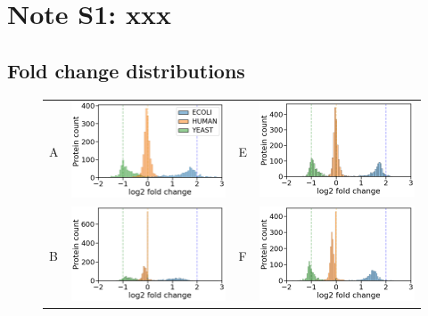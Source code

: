 \documentclass[11pt]{article}
\begin{document}
\maketitle

\section*{Note S1: xxx}
\label{sec:fc-eval}


\iffalse
\subsection*{Fold change distributions}
\begin{figure}[hbt]
    \centering
    \begin{tabular}{lclc} 
        A & \includegraphics[width=0.4\linewidth]{../../result/report_plots/osw_triqler_intensity.png} & 
        E & \includegraphics[width=0.4\linewidth]{../../result/report_plots/diann_triqler_intensity.png} \\ 
        B & \includegraphics[width=0.4\linewidth]{../../result/report_plots/osw_msqrobsum_intensity.png} & 
        F & \includegraphics[width=0.4\linewidth]{../../result/report_plots/diann_msqrobsum_intensity.png} \\ 

\end{tabular}
\end{figure}
\end{document}
